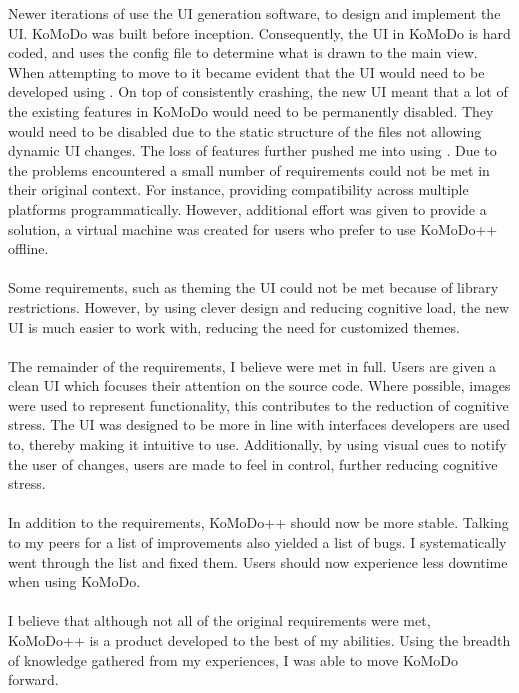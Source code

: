 %
Newer iterations of  use the UI generation software,  to design and implement the UI. KoMoDo was built before  inception. Consequently, the UI in KoMoDo is hard coded, and uses the  config file to determine what is drawn to the main view. When attempting to move to  it became evident that the UI would need to be developed using . On top of  consistently crashing, the new UI meant that a lot of the existing features in KoMoDo would need to be permanently disabled. They would need to be disabled due to the static structure of the  files not allowing dynamic UI changes. The loss of features further pushed me into using .
%
%
%
%
Due to the problems encountered a small number of requirements could not be met in their original context. For instance, providing compatibility across multiple platforms programmatically. However, additional effort was given to provide a solution, a virtual machine was created for users who prefer to use KoMoDo++ offline.\\\\
%
Some requirements, such as theming the UI could not be met because of library restrictions. However, by using clever design and reducing cognitive load, the new UI is much easier to work with, reducing the need for customized themes.\\\\
%
The remainder of the requirements, I believe were met in full. Users are given a clean UI which focuses their attention on the source code. Where possible, images were used to represent functionality, this contributes to the reduction of cognitive stress. The UI was designed to be more in line with interfaces developers are used to, thereby making it intuitive to use. Additionally, by using visual cues to notify the user of changes, users are made to feel in control, further reducing cognitive stress.\\\\
%
In addition to the requirements, KoMoDo++ should now be more stable. Talking to my peers for a list of improvements also yielded a list of bugs. I systematically went through the list and fixed them. Users should now experience less downtime when using KoMoDo.\\\\
%
I believe that although not all of the original requirements were met, KoMoDo++ is a product developed to the best of my abilities. Using the breadth of knowledge gathered from my experiences, I was able to move KoMoDo forward.
